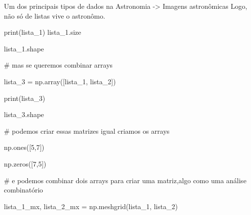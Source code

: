 \documentclass[
  letterpaper,
  DIV=11,
  numbers=noendperiod]{scrreprt}
\newenvironment{Shaded}{\begin{snugshade}}{\end{snugshade}}
\newcommand{\NormalTok}[1]{\textcolor[rgb]{0.00,0.23,0.31}{#1}}
\begin{document}
Um dos principais tipos de dados na Astronomia -\textgreater{} Imagens
astronômicas Logo, não só de listas vive o astronômo.

\begin{Shaded}
\begin{Highlighting}[]
\NormalTok{print(lista\_1)}
\NormalTok{lista\_1.size}
\end{Highlighting}
\end{Shaded}

\begin{Shaded}
\begin{Highlighting}[]
\NormalTok{lista\_1.shape}
\end{Highlighting}
\end{Shaded}

\begin{Shaded}
\begin{Highlighting}[]
\NormalTok{\# mas se queremos combinar arrays}

\NormalTok{lista\_3 = np.array([lista\_1, lista\_2])}
\end{Highlighting}
\end{Shaded}

\begin{Shaded}
\begin{Highlighting}[]
\NormalTok{print(lista\_3)}

\NormalTok{lista\_3.shape}
\end{Highlighting}
\end{Shaded}

\begin{Shaded}
\begin{Highlighting}[]
\NormalTok{\# podemos criar essas matrizes igual criamos os arrays}

\NormalTok{np.ones([5,7])}
\end{Highlighting}
\end{Shaded}

\begin{Shaded}
\begin{Highlighting}[]
\NormalTok{np.zeros([7,5])}
\end{Highlighting}
\end{Shaded}

\begin{Shaded}
\begin{Highlighting}[]
\NormalTok{\# e podemos combinar dois arrays para criar uma matriz,algo como uma análise combinatório}

\NormalTok{lista\_1\_mx, lista\_2\_mx = np.meshgrid(lista\_1, lista\_2)}
\end{Highlighting}
\end{Shaded}
\end{document}
